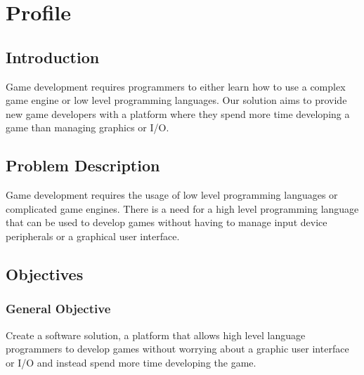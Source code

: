 \section{Profile}

\subsection{Introduction}
Game development requires programmers to either learn how to use a complex game engine or low level programming languages. Our solution aims to provide new game developers with a platform where they spend more time developing a game than managing graphics or I/O.

\subsection{Problem Description}
Game development requires the usage of low level programming languages or complicated game engines. There is a need for a high level programming language that can be used to develop games without having to manage input device peripherals or a graphical user interface.

\subsection{Objectives}

\subsubsection{General Objective}
Create a software solution, a platform that allows high level language programmers to develop games without worrying about a graphic user interface or I/O and instead spend more time developing the game.

